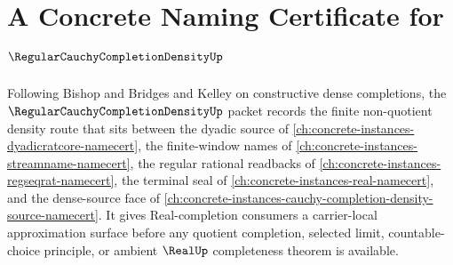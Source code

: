 \chapter{A Concrete Naming Certificate for $\RegularCauchyCompletionDensityUp$}
\label{ch:concrete-instances-regular-cauchy-completion-density-namecert}

Following Bishop and Bridges and Kelley on constructive dense completions, the $\RegularCauchyCompletionDensityUp$ packet records the finite non-quotient density route that sits between the dyadic source of \autoref{ch:concrete-instances-dyadicratcore-namecert}, the finite-window names of \autoref{ch:concrete-instances-streamname-namecert}, the regular rational readbacks of \autoref{ch:concrete-instances-regseqrat-namecert}, the terminal seal of \autoref{ch:concrete-instances-real-namecert}, and the dense-source face of \autoref{ch:concrete-instances-cauchy-completion-density-source-namecert}. It gives Real-completion consumers a carrier-local approximation surface before any quotient completion, selected limit, countable-choice principle, or ambient $\RealUp$ completeness theorem is available.

